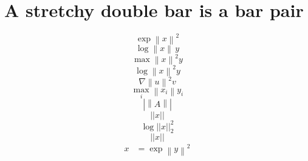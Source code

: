 \documentclass{article}
\begin{document}
\section{A stretchy double bar is a bar pair}
\[ \exp\left\|x\right\|^2 \]
\[ \log\left\|x\right\|\,y \]
\[ \max\left\|x\right\|^2 y \]
\[ \log\left\lVert x\right\rVert^2 y \]
\[ \nabla\left\|u\right\|^2 v \]
\[ \max_i\left\|x_i\right\|y_i \]
\[ \left|\!\left\|A\right\|\!\right| \]
\[ \left|\left|x\right|\right| \]
\[ \log\left|\left|x\right|\right|_{2}^{2} \]
\[ \left\lvert\left\lvert x\right\rvert\right\rvert \]
\begin{equation}\begin{split}x&=\exp\left\|y\right\|^2\end{split}\end{equation}
\end{document}
